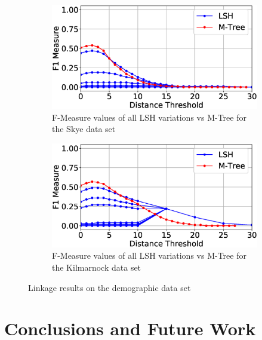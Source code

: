 \documentclass{llncs}
\begin{document}
\begin{figure}
\begin{subfigure}{.5\textwidth}
  \centering
\includegraphics[width=\textwidth]{figures/plotFs-skye-f}
\caption{F-Measure values of all LSH variations vs M-Tree for the Skye data set}
\end{subfigure}%
\begin{subfigure}{.5\textwidth}
  \centering
\includegraphics[width=\textwidth]{figures/plotFs-kilmarnock-f}
\caption{F-Measure values of all LSH variations vs M-Tree for the Kilmarnock data set}
\end{subfigure}

\caption{Linkage results on the demographic data set}
\label{demography-quality-mtree}
\end{figure}





\section{Conclusions and Future Work\label{sec-concl}}
\end{document}

